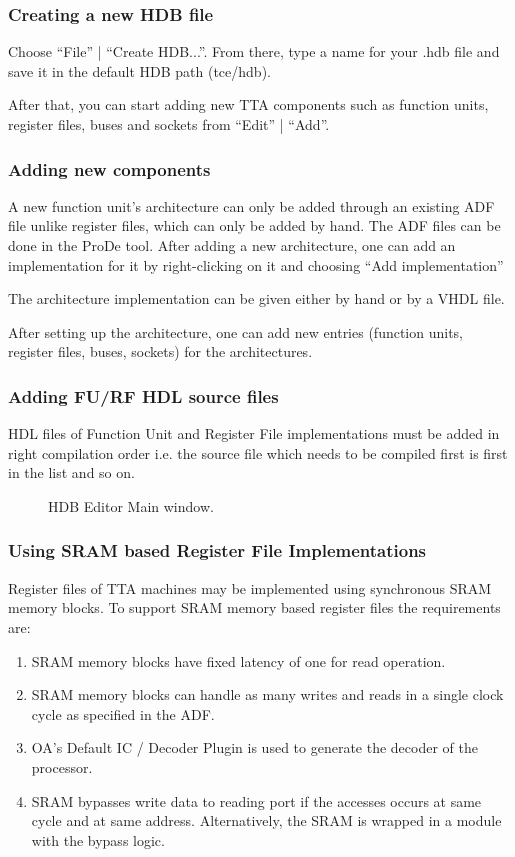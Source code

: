 \documentclass[a4paper,twoside]{tceusermanual}
\begin{document}
\subsubsection{Creating a new HDB file}

Choose ``File'' | ``Create HDB...''. 
From there, type a name for your .hdb file and save it in the default HDB path
(tce/hdb).

After that, you can start adding new TTA components such as function units,
register files, buses and sockets from ``Edit'' | ``Add''.

\subsubsection{Adding new components}
A new function unit's architecture can only be added through an existing ADF
file unlike register files, which can only be added by hand. The ADF files
can be done in the ProDe tool. After adding a new architecture, one can add an
implementation for it by right-clicking on it and choosing ``Add
implementation''

The architecture implementation can be given either by hand or by a VHDL file.

After setting up the architecture, one can add new entries (function units,
register files, buses, sockets) for the architectures.

\subsubsection{Adding FU/RF HDL source files}
HDL files of Function Unit and Register File implementations must be added in
right compilation order i.e. the source file which needs to be compiled first
is first in the list and so on.

\begin{figure}[tb]
\centerline{}
\caption{HDB Editor Main window.}
\label{fig:hdbeditor_main_window}
\end{figure}

\subsubsection{Using SRAM based Register File Implementations}
Register files of TTA machines may be implemented using synchronous
SRAM memory blocks. To support SRAM memory based register files the
requirements are:

\begin{enumerate}
  \item SRAM memory blocks have fixed latency of one for read operation.
  \item SRAM memory blocks can handle as many writes and reads in a
    single clock cycle as specified in the ADF.
  \item OA's Default IC / Decoder Plugin is used to generate the
    decoder of the processor.
  \item \label{itm:bypass_req} SRAM bypasses write data to reading
    port if the accesses occurs at same cycle and at same
    address. Alternatively, the SRAM is wrapped in a module with the
    bypass logic.
\end{enumerate}
\end{document}
